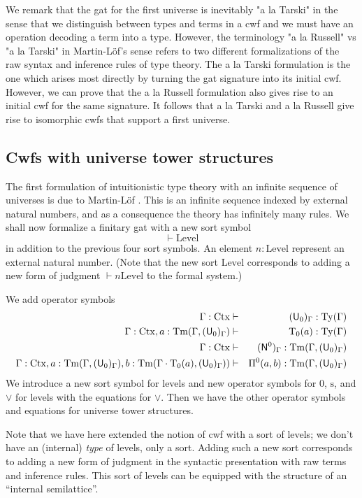 \documentclass{lmcs}
\newcommand{\s}{\mathrm{s}}
\newcommand{\Ta}{\mathrm{T}}
\newcommand{\Level}{\mathrm{Level}}
\def\Ctx{\mathrm{Ctx}}
\begin{document}
We remark that the gat for the first universe is inevitably "a la Tarski" in the sense that we distinguish between types and terms in a cwf and we must have an operation decoding a term into a type. However, the terminology "a la Russell" vs "a la Tarski" in Martin-Löf's sense refers to two different formalizations of the raw syntax and inference rules of type theory. The a la Tarski formulation is the one which arises most directly by turning the gat signature into its initial cwf. However, we can prove that the a la Russell formulation also gives rise to an initial cwf for the same signature. It follows that a la Tarski and a la Russell give rise to isomorphic cwfs that support a first universe.

\subsection{Cwfs with universe tower structures} 

The first formulation of intuitionistic type theory with an infinite sequence of universes is due to Martin-Löf
\cite{martinlof:predicative}. This is an infinite sequence indexed by external natural numbers, and as a consequence the theory has infinitely many rules. We shall now formalize a finitary gat with a new sort symbol 
$$
\vdash \Level
$$
in addition to the previous four sort symbols. An element $n : \Level$ represent an external natural number. (Note that the new sort $\Level$ corresponds to adding a new form of judgment $\vdash n \Level$ to the formal system.)

We add operator symbols
\begin{eqnarray*}
\Gamma : \Ctx &\vdash& (\U_0)_\Gamma : \Ty(\Gamma)\\
\Gamma : \Ctx, a : \Tm(\Gamma,(\U_0)_\Gamma) &\vdash& {\Ta_0}(a) : \Ty(\Gamma)\\
\Gamma : \Ctx &\vdash& (\N^0)_\Gamma : \Tm(\Gamma,(\U_0)_\Gamma) \\
\Gamma : \Ctx, 
a : \Tm(\Gamma,(\U_0)_\Gamma), 
b :  \Tm(\Gamma \cdot \Ta_0(a), (\U_0)_\Gamma))
&\vdash&
 \Pi^0(a,b) : \Tm(\Gamma,(\U_0)_\Gamma)
\end{eqnarray*}
We introduce a new sort symbol for levels and new operator symbols for 0, $\s$, and $\vee$ for levels with the equations for $\vee$. Then we have the other operator symbols and equations for universe tower structures.

Note that we have here extended the notion of cwf with a sort of levels; we don't have an (internal) {\em type} of levels, only a sort. Adding such a new sort corresponds to adding a new form of judgment in the syntactic presentation with raw terms and inference rules.  This sort of levels can be equipped with the structure of an “internal semilattice”.
\end{document}
